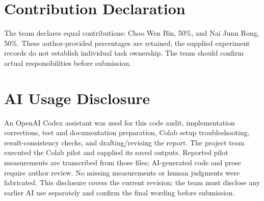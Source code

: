 \documentclass[11pt, letterpaper]{article}
\begin{document}
\section{Contribution Declaration}
The team declares equal contributions: Choo Wen Bin, 50\%, and Nai Junn Rong,
50\%. These author-provided percentages are retained; the supplied experiment
records do not establish individual task ownership. The team should confirm
actual responsibilities before submission.

\section{AI Usage Disclosure}
An OpenAI Codex assistant was used for this code audit, implementation corrections,
test and documentation preparation, Colab setup troubleshooting, result-consistency
checks, and drafting/revising the report.
The project team executed the Colab pilot and supplied its saved outputs. Reported
pilot measurements are transcribed from those files; AI-generated code and prose
require author review. No missing measurements or human judgments were fabricated.
This disclosure covers the current revision; the team must disclose any earlier AI
use separately and confirm the final wording before submission.
\end{document}
